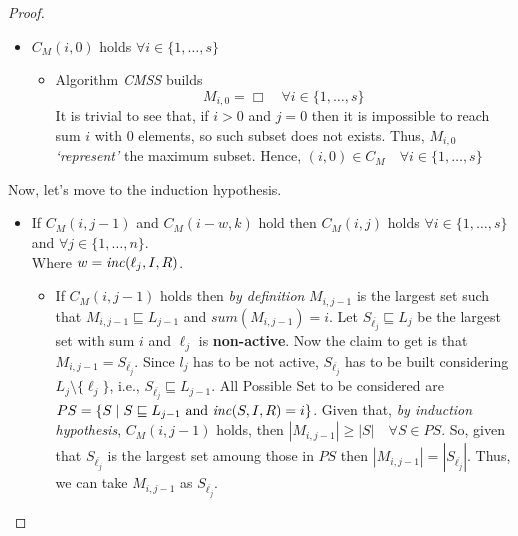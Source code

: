 \begin{proof}
\begin{itemize}
\begin{itemize}
    \end{itemize}
    \item $C_M(i,0)$ holds $\forall i \in \{1, \hdots, s\}$
    \begin{itemize}
        \item Algorithm \textit{CMSS} builds 
        $$M_{i,0} = \Box \quad \forall i \in \{1, \hdots , s\}$$
        It is trivial to see that, if $i > 0$ and $j = 0$ then it is impossible 
        to reach sum $i$ with $0$ elements, so such subset does not exists.
        Thus, $M_{i,0}$ \textit{`represent'} the maximum subset.
        Hence, $(i,0) \in C_M \quad \forall i \in \{1, \hdots, s\}$ 
    \end{itemize}
   \end{itemize}
   Now, let's move to the induction hypothesis.
   \begin{itemize}
    \item If $C_M(i,j-1)$ and $C_M(i-w,k)$ hold then $C_M(i,j)$ holds $\forall i \in \{1,\hdots,s\}$
    and $\forall j \in \{1, \hdots, n\}$.
    \\ Where $w = \mathit{inc}(\ell_j,I,R)$.
    \begin{itemize}
        \item If $C_M(i,j-1)$ holds then \textit{by definition} $M_{i,j-1}$ is the largest set 
            such that $M_{i,j-1} \sqsubseteq L_{j-1}$ and $\mathit{sum}(M_{i,j-1}) = i$.
            Let $S_{\overline{\ell_j}} \sqsubseteq L_j$ be the largest set with sum $i$
            and $\ell_j$ is \textbf{non-active}.
            Now the claim to get is that $M_{i,j-1} = S_{\overline{\ell_j}}$.
            Since $l_j$ has to be not active, $S_{\overline{\ell_j}}$ has to be built considering $L_j \setminus \{\ell_j\}$,
            i.e., $S_{\overline{\ell_j}} \sqsubseteq L_{j-1}$.
            All Possible Set to be considered are $PS = \{S \mid S \sqsubseteq L_{j-1} \text{ and } \mathit{inc}(S,I,R) = i\}$.
            Given that, \textit{by induction hypothesis}, $C_M(i,j-1)$ holds, then $|M_{i,j-1}| \ge |S| \quad \forall S \in PS$.
            So, given that $S_{\overline{\ell_j}}$ is the largest set amoung those in $PS$ then 
            $|M_{i,j-1}| =|S_{\overline{\ell_j}}|$.
            Thus, we can take $M_{i,j-1}$ as $S_{\overline{\ell_j}}$.\\


\end{itemize}
\end{itemize}
\end{proof}
